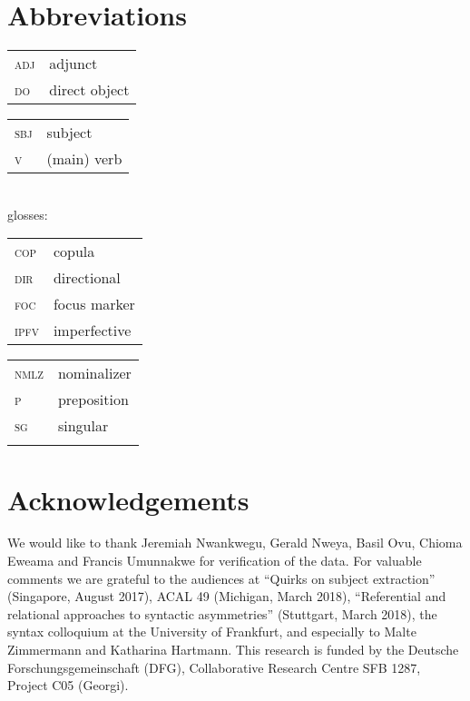 \documentclass[output=paper,colorlinks,citecolor=brown]{langscibook}
\begin{document}
\section*{Abbreviations}
\begin{tabularx}{.45\textwidth}{lQ}
 \textsc{adj}  &  adjunct\\
 \textsc{do}  &  direct object\\
 \end{tabularx}
 \begin{tabularx}{.45\textwidth}{lQ}
 \textsc{sbj}  &  subject\\
 \textsc{v}  &  (main) verb\\
 \end{tabularx}
\medskip\\
 glosses:
\medskip\\
 \begin{tabularx}{.45\textwidth}{lQ}
  \textsc{cop}  &  copula\\
 \textsc{dir}  &  directional\\
 \textsc{foc}  &  focus marker\\
 \textsc{ipfv}  &  imperfective\\
 \end{tabularx}
 \begin{tabularx}{.45\textwidth}{lQ}
 \textsc{nmlz}  &  nominalizer\\
 \textsc{p}  &  preposition\\
  \textsc{sg}  &  singular\\
  \\
\end{tabularx}


\section*{Acknowledgements}
We would like to thank Jeremiah Nwankwegu, Gerald Nweya, Basil Ovu, Chioma Eweama and Francis Umunnakwe for verification of the  data. For valuable comments we are grateful to the audiences at ``Quirks on subject extraction'' (Singapore, August 2017), ACAL 49 (Michigan, March 2018), ``Referential and relational approaches to syntactic asymmetries'' (Stuttgart, March 2018), the syntax colloquium at the University of Frankfurt, and especially to Malte Zimmermann and Katharina Hartmann. This research is funded by the Deutsche Forschungsgemeinschaft (DFG), Collaborative Research Centre SFB 1287, Project C05 (Georgi).

\sloppy
 \printbibliography[heading=subbibliography,notkeyword=this]
\end{document}
